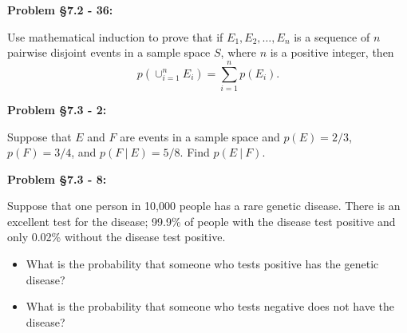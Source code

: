 \documentclass{article}
\newenvironment{problem}[1]
    {\begin{mdframed}[default]
    \textbf{Problem #1:}
    }
    {\end{mdframed}
    }
\begin{document}
\begin{problem}{\S 7.2 - 36}
Use mathematical induction to prove that if $E_1, E_2, \dots, E_n$ is a sequence of $n$ pairwise disjoint events in a sample space $S$, where $n$ is a positive integer, then 
\[ p\left( \cup_{i=1}^n E_i \right) = \sum_{i=1}^n p(E_i).\]
\end{problem}

\begin{problem}{\S 7.3 - 2}
Suppose that $E$ and $F$ are events in a sample space and $p(E) = 2/3$, $p(F) = 3/4$, and $p(F~|~E) = 5/8$. Find $p(E~|~F)$.
\end{problem}

\begin{problem}{\S 7.3 - 8}
Suppose that one person in 10,000 people has a rare genetic disease. There is an excellent test for the disease; 99.9\% of people with the disease test positive and only 0.02\% without the disease test positive.
\begin{itemize}
    \item[(a)] What is the probability that someone who tests positive has the genetic disease?
    \item[(b)] What is the probability that someone who tests negative does not have the disease?
\end{itemize}
\end{problem}
\end{document}
